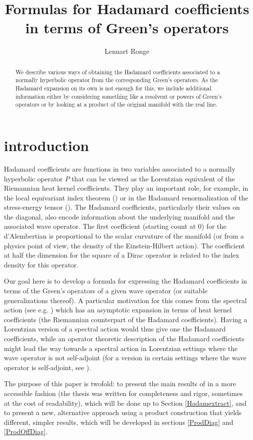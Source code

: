 \documentclass[11pt]{article}
\author{Lennart Ronge}
\title{Formulas for Hadamard coefficients in terms of Green's operators}
\begin{document}
\maketitle
\begin{abstract}
 We describe various ways of obtaining the Hadamard coefficients associated to a normally hyperbolic operator from the corresponding Green's operators. As the Hadamard expansion on its own is not enough for this, we include additional information either by considering something like a resolvent or powers of Green's operators or by looking at a product of the original manifold with the real line.
\end{abstract}
\section{introduction}
Hadamard coefficients are functions in two variables associated to a normally hyperbolic operator $P$ that can be viewed as the Lorentzian equivalent of the Riemannian heat kernel coefficients. They play an important role, for example, in the local equivariant index theorem (\cite{BS}) or in the Hadamard renormalization of the stress-energy tensor (\cite{DeFo}). The Hadamard coefficients, particularly their values on the diagonal, also encode information about the underlying manifold and the associated wave operator. The first coefficient (starting count at $0$) for the d'Alembertian is proportional to the scalar curvature of the manifold (or from a physics point of view, the density of the Einstein-Hilbert action). The coefficient at half the dimension for the square of a Dirac operator is related to the index density for this operator.

Our goal here is to develop a formula for expressing the Hadamard coefficients in terms of the Green's operators of a given wave operator (or suitable generalizations thereof). A particular motivation for this comes from the spectral action (see e.g. \cite{CoCh}) which has an asymptotic expansion in terms of heat kernel coefficients (the Riemannian counterpart of the Hadamard coefficients). Having a Lorentzian version of a spectral action would thus give one the Hadamard coefficients, while an operator theoretic description of the Hadamard coefficients might lead the way towards a spectral action in Lorentzian settings where the wave operator is not self-adjoint (for a version in certain settings where the wave operator is self-adjoint, see \cite{DaWr}).

The purpose of this paper is twofold: to present the main results of \cite{Ron} in a more accessible fashion (the thesis was written for completeness and rigor, sometimes at the cost of readability), which will be done up to Section \ref{Hadamextract}, and to present a new, alternative approach using a product construction that yields different, simpler results, which will be developed in sections \ref{ProdDiag} and \ref{ProdOffDiag}.
\end{document}
